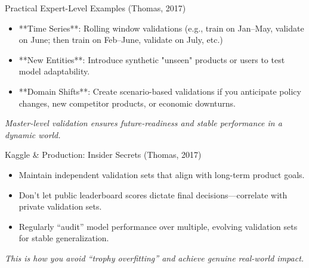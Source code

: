 \documentclass[aspectratio=169]{beamer}
\begin{document}
\begin{frame}{Practical Expert-Level Examples (Thomas, 2017)}
\begin{itemize}
\item **Time Series**: Rolling window validations (e.g., train on Jan–May, validate on June; then train on Feb–June, validate on July, etc.)
\item **New Entities**: Introduce synthetic "unseen" products or users to test model adaptability.
\item **Domain Shifts**: Create scenario-based validations if you anticipate policy changes, new competitor products, or economic downturns.
\end{itemize}

\emph{Master-level validation ensures future-readiness and stable performance in a dynamic world.}
\end{frame}

\begin{frame}{Kaggle & Production: Insider Secrets (Thomas, 2017)}
\begin{itemize}
\item Maintain independent validation sets that align with long-term product goals.
\item Don’t let public leaderboard scores dictate final decisions—correlate with private validation sets.
\item Regularly “audit” model performance over multiple, evolving validation sets for stable generalization.
\end{itemize}

\emph{This is how you avoid “trophy overfitting” and achieve genuine real-world impact.}
\end{frame}
\end{document}
